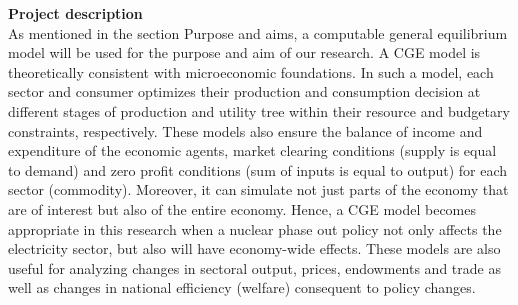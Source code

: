 \begin{comment}
Nuclear safety and waste disposal.: Number of people surrounding nuclear power plant at 30 km radius.
Current political situation regarding nuclear phase out in Sweden: What current government says and what its opposition parties says
To represent the government plan,
To represent the opposition parties plan,
Potential role of hydropower, renewable and carbon capture and sequestration.
Current energy status of Sweden.
Considering the nuclear power to be phase out, and the possibility of substituting it by relatively in expensive technique of fossil fuel power is excluded due to CO2 commitment and hydropower development is restricted due to its capacity, then the price and supply of electricity will most certainly be affected.

To expand hydroelectric power or to revert to importing oil and gas to substitute for nuclear energy are hardly options for an environmentally conscious state like Sweden. Moreover, replacing nuclear power with renewable energy sources is not currently a realistic option.

The purpose of this research is to examine the effects of different policy scenarios with respect to Swedish energy policy, specifically issues concerning a nuclear phase-out and restrictions on CO2 emissions.

\end{comment}



\textbf{Project description}\\
As mentioned in the section Purpose and aims, a computable general equilibrium model will be used for the purpose and aim of our research. A CGE model is theoretically consistent with microeconomic foundations. In such a model, each sector and consumer optimizes their production and consumption decision at different stages of production and utility tree within their resource and budgetary constraints, respectively. These models also ensure the balance of income and expenditure of the economic agents, market clearing conditions (supply is equal to demand) and zero profit conditions (sum of inputs is equal to output) for each sector (commodity). Moreover, it can simulate not just parts of the economy that are of interest but also of the entire economy. Hence, a CGE model becomes appropriate in this research when a nuclear phase out policy not only affects the electricity sector, but also will have economy-wide effects. These models are also useful for analyzing changes in sectoral output, prices, endowments and trade as well as changes in national efficiency (welfare) consequent to policy changes.

